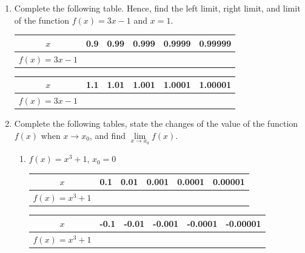 \documentclass[12pt]{report}
\begin{document}
\begin{enumerate}
  \item Complete the following table. Hence, find the left limit, right limit, and
        limit of the function $f (x) = 3x - 1$ and $x = 1$.
        \begin{center}
          \begin{tabular}{|c|c|c|c|c|c|}
            \hline
            $x$              & 0.9 & 0.99 & 0.999 & 0.9999 & 0.99999 \\
            \hline
            $f (x) = 3x - 1$ &     &      &       &        &         \\
            \hline
          \end{tabular}
          \vskip 0.2cm
          \begin{tabular}{|c|c|c|c|c|c|}
            \hline
            $x$              & 1.1 & 1.01 & 1.001 & 1.0001 & 1.00001 \\
            \hline
            $f (x) = 3x - 1$ &     &      &       &        &         \\
            \hline
          \end{tabular}
        \end{center}

  \item Complete the following tables, state the changes of the value of the function
        $f (x)$ when $x \to x_0$, and find $\lim\limits_{x \to x_0} f (x)$.
        \begin{enumerate}
          \item $f (x) = x^3 + 1$, $x_0 = 0$
                \begin{center}
                  \begin{tabular}{|c|c|c|c|c|c|}
                    \hline
                    $x$               & 0.1 & 0.01 & 0.001 & 0.0001 & 0.00001 \\
                    \hline
                    $f (x) = x^3 + 1$ &     &      &       &        &         \\
                    \hline
                  \end{tabular}
                  \vskip 0.2cm
                  \begin{tabular}{|c|c|c|c|c|c|}
                    \hline
                    $x$               & -0.1 & -0.01 & -0.001 & -0.0001 & -0.00001 \\
                    \hline
                    $f (x) = x^3 + 1$ &      &       &        &         &          \\
                    \hline
                  \end{tabular}
                \end{center}


\end{enumerate}
\end{enumerate}
\end{document}
